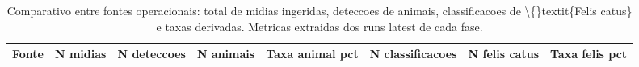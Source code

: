 \begin{table}[!htb]
\centering
\caption{Comparativo entre fontes operacionais: total de midias ingeridas, deteccoes de animais, classificacoes de \textbackslash\{\}textit\{Felis catus\} e taxas derivadas. Metricas extraidas dos runs latest de cada fase.}
\label{tab:comparativo-fontes}
\begin{tabular}{lrrrrrrr}
\toprule
Fonte & N midias & N deteccoes & N animais & Taxa animal pct & N classificacoes & N felis catus & Taxa felis pct \\
\midrule
\bottomrule
\end{tabular}
\end{table}
